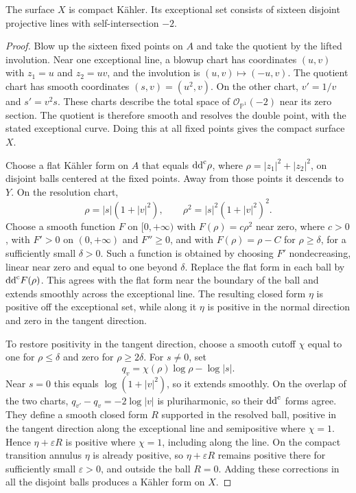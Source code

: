 \begin{lemma}\label{lem:kummer-resolution-kahler}
The surface $X$ is compact K\"ahler. Its exceptional set consists of sixteen disjoint projective lines with self-intersection $-2$.
\end{lemma}
\begin{proof}
Blow up the sixteen fixed points on $A$ and take the quotient by the lifted involution. Near one exceptional line, a blowup chart has coordinates $(u,v)$ with $z_1=u$ and $z_2=uv$, and the involution is $(u,v)\mapsto(-u,v)$. The quotient chart has smooth coordinates $(s,v)=(u^2,v)$. On the other chart, $v'=1/v$ and $s'=v^2s$. These charts describe the total space of $\mathcal O_{\mathbb P^1}(-2)$ near its zero section. The quotient is therefore smooth and resolves the double point, with the stated exceptional curve. Doing this at all fixed points gives the compact surface $X$.

Choose a flat K\"ahler form on $A$ that equals $\mathrm{dd}^{\mathrm{c}}\rho$, where $\rho=|z_1|^2+|z_2|^2$, on disjoint balls centered at the fixed points. Away from those points it descends to $Y$. On the resolution chart,
\[
 \rho=|s|(1+|v|^2),\qquad
 \rho^2=|s|^2(1+|v|^2)^2.
\]
Choose a smooth function $F$ on $[0,+\infty)$ with $F(\rho)=c\rho^2$ near zero, where $c>0$, with $F'>0$ on $(0,+\infty)$ and $F''\geq0$, and with $F(\rho)=\rho-C$ for $\rho\geq\delta$, for a sufficiently small $\delta>0$. Such a function is obtained by choosing $F'$ nondecreasing, linear near zero and equal to one beyond $\delta$. Replace the flat form in each ball by $\mathrm{dd}^{\mathrm{c}} F(\rho)$. This agrees with the flat form near the boundary of the ball and extends smoothly across the exceptional line. The resulting closed form $\eta$ is positive off the exceptional set, while along it $\eta$ is positive in the normal direction and zero in the tangent direction.

To restore positivity in the tangent direction, choose a smooth cutoff $\chi$ equal to one for $\rho\leq\delta$ and zero for $\rho\geq2\delta$. For $s\ne0$, set
\[
 q_v=\chi(\rho)\log\rho-\log|s|.
\]
Near $s=0$ this equals $\log(1+|v|^2)$, so it extends smoothly. On the overlap of the two charts, $q_{v'}-q_v=-2\log|v|$ is pluriharmonic, so their $\mathrm{dd}^{\mathrm{c}}$ forms agree. They define a smooth closed form $R$ supported in the resolved ball, positive in the tangent direction along the exceptional line and semipositive where $\chi=1$. Hence $\eta+\varepsilon R$ is positive where $\chi=1$, including along the line. On the compact transition annulus $\eta$ is already positive, so $\eta+\varepsilon R$ remains positive there for sufficiently small $\varepsilon>0$, and outside the ball $R=0$. Adding these corrections in all the disjoint balls produces a K\"ahler form on $X$.
\end{proof}

